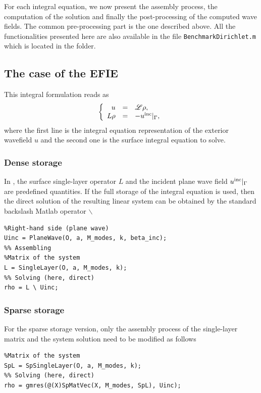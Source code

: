 For each integral equation, we now present the assembly process, the computation of the solution and finally the post-processing of the computed wave
fields. 
The common pre-processing part is the one described above. All the functionalities presented here are also available in  the
 file \texttt{BenchmarkDirichlet.m} which is located in the   folder.

\subsection{The case of the EFIE}


This integral formulation reads as
$$
\left\{\begin{array}{r c l}
u &=& {\mathscr L}\rho,\\
L\rho &=& -u^{\textrm{inc}}|_{\Gamma},
\end{array}\right.
$$
where the first line is the integral equation representation of the exterior wavefield $u$ and the second one is  the surface 
integral equation to solve. 

\subsubsection{Dense storage}

In \mudiff, the surface single-layer operator $L$ and the incident plane wave field $u^{\textrm{inc}}|_{\Gamma}$ are  predefined quantities.
If the full storage of the integral equation is used, then the direct solution of the resulting linear system can be
obtained by the standard backslash Matlab operator $\backslash$ 
\begin{lstlisting}
%Right-hand side (plane wave)
Uinc = PlaneWave(O, a, M_modes, k, beta_inc);
%% Assembling
%Matrix of the system
L = SingleLayer(O, a, M_modes, k);
%% Solving (here, direct)
rho = L \ Uinc;
\end{lstlisting}
\medskip

\subsubsection{Sparse storage}

For the sparse storage version, only the assembly process of the single-layer matrix and the system solution
need to be modified as follows
\begin{lstlisting}
%Matrix of the system
SpL = SpSingleLayer(O, a, M_modes, k);
%% Solving (here, direct)
rho = gmres(@(X)SpMatVec(X, M_modes, SpL), Uinc);
\end{lstlisting}
\medskip


